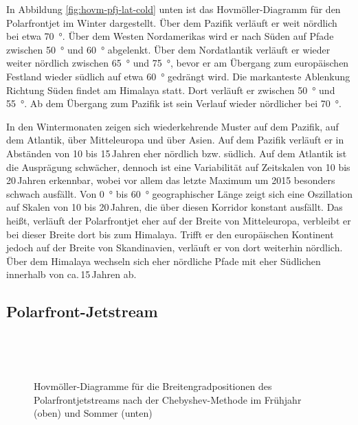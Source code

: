 In Abbildung \ref{fig:hovm-pfj-lat-cold} unten ist das Hovmöller-Diagramm für den Polarfrontjet im Winter dargestellt. Über dem Pazifik verläuft er weit nördlich bei etwa \SI{70}{\degree}. Über dem Westen Nordamerikas wird er nach Süden auf Pfade zwischen \SI{50}{\degree} und \SI{60}{\degree} abgelenkt. Über dem Nordatlantik verläuft er wieder weiter nördlich zwischen \SI{65}{\degree} und \SI{75}{\degree}, bevor er am Übergang zum europäischen Festland wieder südlich auf etwa \SI{60}{\degree} gedrängt wird. Die markanteste Ablenkung Richtung Süden findet am Himalaya statt. Dort verläuft er zwischen \SI{50}{\degree} und \SI{55}{\degree}. Ab dem Übergang zum Pazifik ist sein Verlauf wieder nördlicher bei \SI{70}{\degree}.

In den Wintermonaten zeigen sich wiederkehrende Muster auf dem Pazifik, auf dem Atlantik, über Mitteleuropa und über Asien. Auf dem Pazifik verläuft er in Abständen von 10 bis 15\,Jahren eher nördlich bzw. südlich. Auf dem Atlantik ist die Ausprägung schwächer, dennoch ist eine Variabilität auf Zeitskalen von 10 bis 20\,Jahren erkennbar, wobei vor allem das letzte Maximum um 2015 besonders schwach ausfällt. Von \SI{0}{\degree} bis \SI{60}{\degree} geographischer Länge zeigt sich eine Oszillation auf Skalen von 10 bis 20\,Jahren, die über diesen Korridor konstant ausfällt. Das heißt, verläuft der Polarfrontjet eher auf der Breite von Mitteleuropa, verbleibt er bei dieser Breite dort bis zum Himalaya. Trifft er den europäischen Kontinent jedoch auf der Breite von Skandinavien, verläuft er von dort weiterhin nördlich. Über dem Himalaya wechseln sich eher nördliche Pfade mit eher Südlichen innerhalb von ca.\,15\,Jahren ab.

\subsection{Polarfront-Jetstream}

\begin{figure} %
  \centering
  \begin{minipage}{\textwidth}
    \centering
  \end{minipage} \\ 
    \begin{minipage}{\textwidth}
      \centering
  \end{minipage} \\ 
  \caption[Hovmöllerdiagramme der Positionen des Polarfrontjets nach Chebyshev im Frühjahr und Sommer]{Hovmöller-Diagramme für die Breitengradpositionen des Polarfrontjetstreams nach der Chebyshev-Methode im Frühjahr (oben) und Sommer (unten)} \label{fig:hovm-pfj-lat-warm}
\end{figure}

